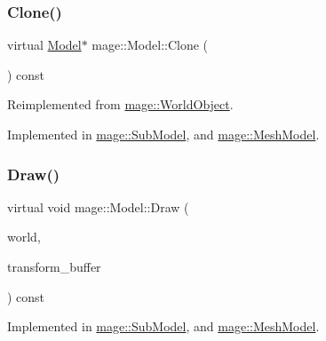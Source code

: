 \hypertarget{classmage_1_1_model_ae5e9bee52da0db8c7a29920c13ed40ea}{}\label{classmage_1_1_model_ae5e9bee52da0db8c7a29920c13ed40ea} 
\subsubsection{\texorpdfstring{Clone()}{Clone()}}
{\footnotesize\ttfamily virtual \hyperlink{classmage_1_1_model}{Model}$\ast$ mage\+::\+Model\+::\+Clone (\begin{DoxyParamCaption}{ }\end{DoxyParamCaption}) const\hspace{0.3cm}{\ttfamily [pure virtual]}}



Reimplemented from \hyperlink{classmage_1_1_world_object_a8793d22cb63b1bd31b1307e5e7094f61}{mage\+::\+World\+Object}.



Implemented in \hyperlink{classmage_1_1_sub_model_a368bcc2ee819cc29ec0203e314ae91d3}{mage\+::\+Sub\+Model}, and \hyperlink{classmage_1_1_mesh_model_a7130eca9a1dac038c33b838c15138161}{mage\+::\+Mesh\+Model}.

\hypertarget{classmage_1_1_model_a766c89cdac2e3df748cd73f8ed8bbff5}{}\label{classmage_1_1_model_a766c89cdac2e3df748cd73f8ed8bbff5} 
\subsubsection{\texorpdfstring{Draw()}{Draw()}}
{\footnotesize\ttfamily virtual void mage\+::\+Model\+::\+Draw (\begin{DoxyParamCaption}\item[{const \hyperlink{classmage_1_1_world}{World} \&}]{world,  }\item[{const Transform\+Buffer \&}]{transform\+\_\+buffer }\end{DoxyParamCaption}) const\hspace{0.3cm}{\ttfamily [pure virtual]}}



Implemented in \hyperlink{classmage_1_1_sub_model_a2fa14949edacbe995749f4b05bdc3cf5}{mage\+::\+Sub\+Model}, and \hyperlink{classmage_1_1_mesh_model_a80ef930e0ce901293106ce4ea1336e26}{mage\+::\+Mesh\+Model}.

\hypertarget{classmage_1_1_model_ab50233128bb52002a11f3195b846c830}{}\label{classmage_1_1_model_ab50233128bb52002a11f3195b846c830} 
